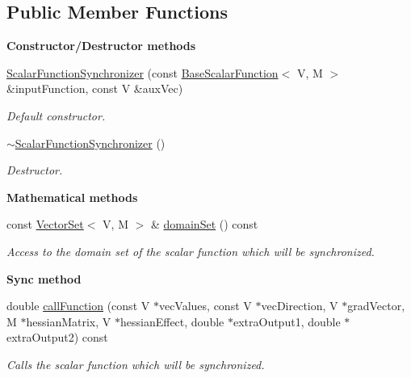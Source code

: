 \subsection*{Public Member Functions}
\begin{Indent}{\bf Constructor/\-Destructor methods}\par
\begin{DoxyCompactItemize}
\item 
\hyperlink{class_q_u_e_s_o_1_1_scalar_function_synchronizer_ab016c60ae0ab70f4406fefeb50405acf}{Scalar\-Function\-Synchronizer} (const \hyperlink{class_q_u_e_s_o_1_1_base_scalar_function}{Base\-Scalar\-Function}$<$ V, M $>$ \&input\-Function, const V \&aux\-Vec)
\begin{DoxyCompactList}\small\item\em Default constructor. \end{DoxyCompactList}\item 
\hyperlink{class_q_u_e_s_o_1_1_scalar_function_synchronizer_a6ce2562f5d0ad7fe0d4e63dbe5a0e9f1}{$\sim$\-Scalar\-Function\-Synchronizer} ()
\begin{DoxyCompactList}\small\item\em Destructor. \end{DoxyCompactList}\end{DoxyCompactItemize}
\end{Indent}
\begin{Indent}{\bf Mathematical methods}\par
\begin{DoxyCompactItemize}
\item 
const \hyperlink{class_q_u_e_s_o_1_1_vector_set}{Vector\-Set}$<$ V, M $>$ \& \hyperlink{class_q_u_e_s_o_1_1_scalar_function_synchronizer_a4618272a8d897dc064a42510039cefcc}{domain\-Set} () const 
\begin{DoxyCompactList}\small\item\em Access to the domain set of the scalar function which will be synchronized. \end{DoxyCompactList}\end{DoxyCompactItemize}
\end{Indent}
\begin{Indent}{\bf Sync method}\par
\begin{DoxyCompactItemize}
\item 
double \hyperlink{class_q_u_e_s_o_1_1_scalar_function_synchronizer_adcdc70486ac64c11d0e505c4fb590a6b}{call\-Function} (const V $\ast$vec\-Values, const V $\ast$vec\-Direction, V $\ast$grad\-Vector, M $\ast$hessian\-Matrix, V $\ast$hessian\-Effect, double $\ast$extra\-Output1, double $\ast$extra\-Output2) const 
\begin{DoxyCompactList}\small\item\em Calls the scalar function which will be synchronized. \end{DoxyCompactList}\end{DoxyCompactItemize}
\end{Indent}

